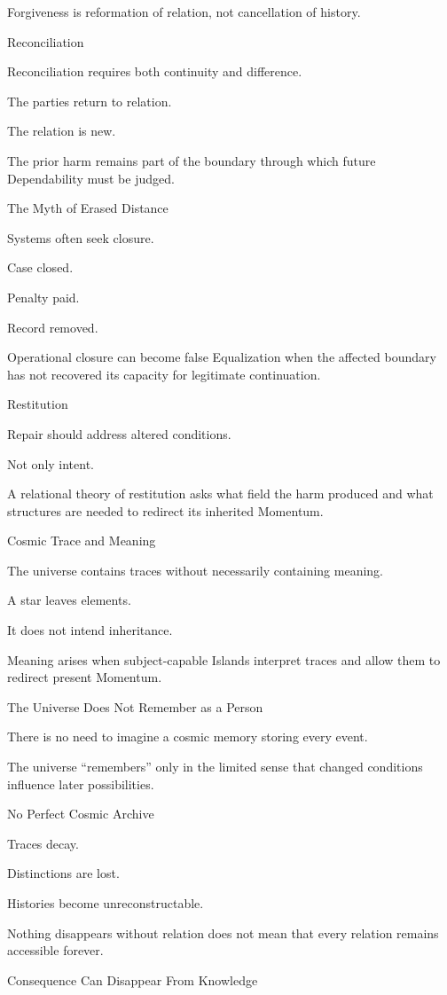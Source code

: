 Forgiveness is reformation of relation, not cancellation of history.

Reconciliation

Reconciliation requires both continuity and difference.

The parties return to relation.

The relation is new.

The prior harm remains part of the boundary through which future Dependability must be judged.

The Myth of Erased Distance

Systems often seek closure.

Case closed.

Penalty paid.

Record removed.

Operational closure can become false Equalization when the affected boundary has not recovered its capacity for legitimate continuation.

Restitution

Repair should address altered conditions.

Not only intent.

A relational theory of restitution asks what field the harm produced and what structures are needed to redirect its inherited Momentum.

Cosmic Trace and Meaning

The universe contains traces without necessarily containing meaning.

A star leaves elements.

It does not intend inheritance.

Meaning arises when subject-capable Islands interpret traces and allow them to redirect present Momentum.

The Universe Does Not Remember as a Person

There is no need to imagine a cosmic memory storing every event.

The universe “remembers” only in the limited sense that changed conditions influence later possibilities.

No Perfect Cosmic Archive

Traces decay.

Distinctions are lost.

Histories become unreconstructable.

Nothing disappears without relation does not mean that every relation remains accessible forever.

Consequence Can Disappear From Knowledge

